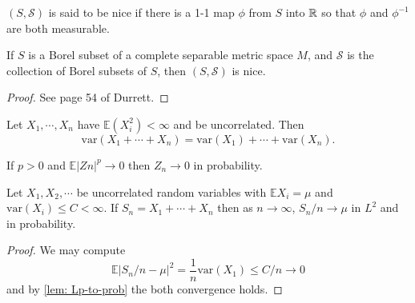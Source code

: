 \begin{definition}
     $(S, \mathcal{S})$ is said to be nice if there is a 1-1 map $\phi$ from $S$ into $\mathbb{R}$ so that $\phi$ and $\phi^{-1}$ are both measurable.
\end{definition}

\begin{theorem}
    If $S$ is a Borel subset of a complete separable metric space $M$, and $\mathcal{S}$ is the collection of Borel subsets of $S$, then $(S, \mathcal{S})$ is nice.
\end{theorem}
\begin{proof}
    See page 54 of Durrett.
\end{proof}

\begin{theorem}
    Let $X_1, \cdots , X_n$ have $\mathbb{E}(X^2_i) < \infty$ and be uncorrelated. Then
    \[\text{var}(X_1 + \cdots + X_n) = \text{var}(X_1) + \cdots + \text{var}(X_n).\]
\end{theorem}

\begin{lemma}
\label{lem: Lp-to-prob}
    If $p > 0$ and $\mathbb E|Zn|^p \to 0$ then $Z_n \to 0$ in probability.
\end{lemma}

\begin{theorem}\label{thm: L2-weak-law}
    Let $X_1, X_2, \cdots$ be uncorrelated random variables with $\mathbb EX_i = \mu$ and $\text{var} (X_i) \leq C < \infty$. If $S_n = X_1 + \cdots + X_n$ then as $n \to \infty$, $S_n/n \to \mu$ in $L^2$ and in probability.
\end{theorem}
\begin{proof}
    We may compute
    \[
    \mathbb E\left|S_n/n - \mu\right|^2 = \dfrac{1}{n}\text{var}(X_1) \leq C/n \to 0
    \]
    and by \ref{lem: Lp-to-prob} the both convergence holds.
\end{proof}

